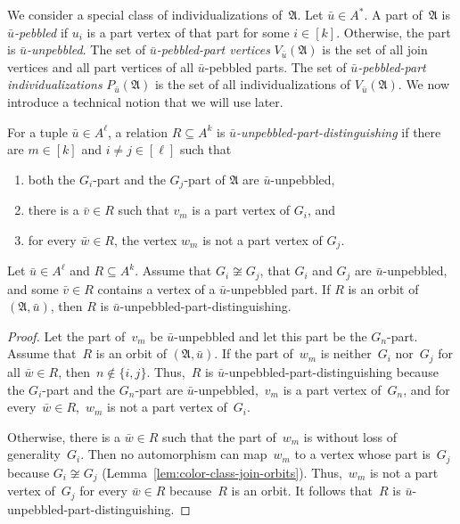 \documentclass[]{lmcs}
\newcommand{\defining}[1]{\emph{#1}}
\newcommand{\iso}{\cong}
\newcommand{\set}[1]{\lbrace #1 \rbrace}
\newcommand{\tup}[1]{\bar{#1}}
\newcommand{\Struct}{\mathfrak{A}}
\newcommand{\StructV}{A}
\newcommand{\vertA}{u}
\newcommand{\vertB}{v}
\newcommand{\vertC}{w}
\newcommand{\StructA}{\mathfrak{A}}
\newcommand{\StructVA}{A}
\newcommand{\partind}[2]{P_{#2}(#1)}
\newcommand{\partvert}[2]{V_{#2}(#1)}
\begin{document}
We consider a special class of individualizations of~$\StructA$.
Let $\tup{\vertA} \in \StructVA^*$.
A part of~$\Struct$ is \defining{$\tup{\vertA}$\nobreakdash-pebbled}
if $\vertA_i$ is a part vertex of that part for some $i \in [k]$.
Otherwise, the part is \defining{$\tup{\vertA}$\nobreakdash-unpebbled}.
The set of \defining{$\tup{\vertA}$\nobreakdash-pebbled-part vertices} $\partvert{\Struct}{\tup{\vertA}}$
is the set of all join vertices and all part vertices of all $\tup{\vertA}$\nobreakdash-pebbled parts.
The set of \defining{$\tup{\vertA}$\nobreakdash-pebbled-part individualizations} $\partind{\Struct}{\tup{\vertA}}$ is the set of all individualizations of $\partvert{\Struct}{\tup{\vertA}}$.
We now introduce a technical notion that we will use later.
\begin{defi}
For a tuple $\tup{\vertA} \in \StructVA^\ell$,
a relation $R \subseteq \StructV^k$ is \defining{$\tup{\vertA}$\nobreakdash-unpebbled-part-distinguishing} if there are $m \in [k]$
and $i \neq j \in [\ell]$
such that 
\begin{enumerate}
	\item both the $G_i$-part and the $G_j$-part of $\StructA$ are $\tup{\vertA}$-unpebbled,
	\item there is a $\tup{\vertB} \in R$
	such that $\vertB_m$ is a part vertex of $G_i$, and 
	\item for every $\tup{\vertC} \in R$,
	the vertex $\vertC_m$ is not a part vertex of $G_j$.
\end{enumerate}
\end{defi}
\begin{lem}
	\label{lem:orbit-unpebble-part-distinguishing}
	Let $\tup{\vertA} \in \StructVA^\ell$ and
	$R \subseteq \StructV^k$.
	Assume that $G_i \not\iso G_j$,
	that $G_i$ and $G_j$ are $\tup{\vertA}$\nobreakdash-unpebbled,
	and some $\tup{\vertB} \in R$ contains a vertex of a $\tup{\vertA}$-unpebbled part.
	If $R$ is an orbit of $(\StructA, \tup{\vertA})$,
	then $R$ is $\tup{\vertA}$-unpebbled-part-distinguishing.
\end{lem}
\begin{proof}
	Let the part of~$\vertB_m$ be $\tup{\vertA}$-unpebbled
	and let this part be the $G_n$-part.
	Assume that~$R$ is an orbit of $(\StructA, \tup{\vertA})$.
	If the part of~$\vertC_m$ is neither~$G_i$ nor~$G_j$ for all $\tup{\vertC}\in R$,
	then~${n \notin \set{i,j}}$.
	Thus,~$R$ is $\tup{\vertA}$-unpebbled-part-distinguishing
	because the $G_i$-part and the $G_n$-part are $\tup{\vertA}$\nobreakdash-unpebbled,~$\vertB_m$ is a part vertex of~$G_n$,
	and for every~$\tup{\vertC}\in R$,~$\vertC_m$ is not a part vertex of~$G_i$.
	
	Otherwise, there is a $\tup{\vertC} \in R$ such that
	the part of~$\vertC_m$ is without loss of generality~$G_i$.
	Then no automorphism can map~$\vertC_m$ to a vertex whose part is~$G_j$
	because $G_i \not\iso G_j$ (Lemma~\ref{lem:color-class-join-orbits}).
	Thus,~$\vertC_m$ is not a part vertex of~$G_j$ for every $\tup{\vertC} \in R$ because~$R$ is an orbit.
	It follows that~$R$ is $\tup{\vertA}$-unpebbled-part-distinguishing.
\end{proof}
\end{document}
